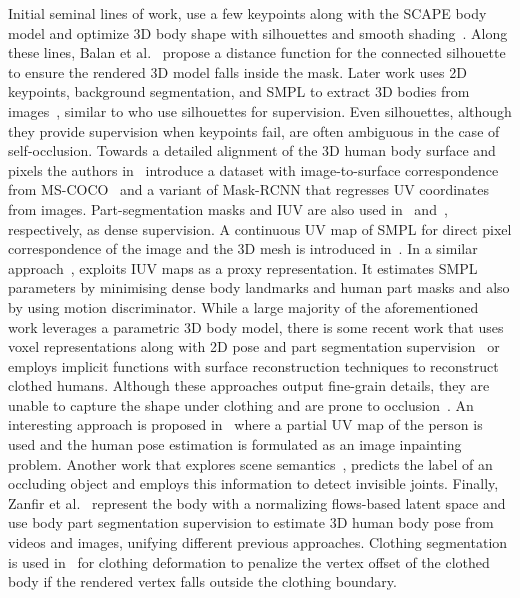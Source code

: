 \documentclass[10pt,twocolumn,letterpaper]{article}
\begin{document}
Initial seminal lines of work, use a few keypoints along with the SCAPE body model and optimize 3D body shape with silhouettes and smooth shading~\cite{Guan2009EstimatingHS}. Along these lines, Balan et al.~\cite{balan_eccv} propose a distance function for the connected silhouette to ensure the rendered 3D model falls inside the mask. Later work uses 2D keypoints, background segmentation, and SMPL to extract 3D bodies from images~\cite{Tung2017SelfsupervisedLO}, similar to \cite{pavlakos2018} who use silhouettes for supervision. Even silhouettes, although they provide supervision when keypoints fail, are often ambiguous in the case of self-occlusion. Towards a detailed alignment of the 3D human body surface and pixels the authors in~\cite{Gler2018DensePoseDH} introduce a dataset with image-to-surface correspondence from MS-COCO~\cite{coco} and a variant of Mask-RCNN that regresses UV coordinates from images. Part-segmentation masks and IUV are also used in~\cite{nbf} and~\cite{densecor}, respectively, as dense supervision. A continuous UV map of SMPL for direct pixel correspondence of the image and the 3D mesh is introduced in~\cite{densecor}. In a similar approach~\cite{denserac}, exploits IUV maps as a proxy representation. It estimates SMPL parameters by minimising dense body landmarks and human part masks and also by using motion discriminator. While a large majority of the aforementioned work leverages a parametric 3D body model, there is some recent work that uses voxel representations along with 2D pose and part segmentation supervision~\cite{Varol2018BodyNetVI} or employs implicit functions with surface reconstruction techniques to reconstruct clothed humans. Although these approaches output fine-grain details, they are unable to capture the shape under clothing and are prone to occlusion~\cite{He2020GeoPIFuGA, Saito2019PIFuPI, saito2020pifuhd}. An interesting approach is proposed in~\cite{Zhang2020ObjectOccludedHS} where a partial UV map of the person is used and the human pose estimation is formulated as an image inpainting problem. Another work that explores scene semantics~\cite{Rafi2015ASO}, predicts the label of an occluding object and employs this information to detect invisible joints. Finally, Zanfir et al.~\cite{Zanfir2020WeaklyS3} represent the body with a normalizing flows-based latent space and use body part segmentation supervision to estimate 3D human body pose from videos and images, unifying different previous approaches. Clothing segmentation is used in~\cite{Xiang2020MonoClothCapTT} for clothing deformation to penalize the vertex offset of the clothed body if the rendered vertex falls outside the clothing boundary.
\end{document}
